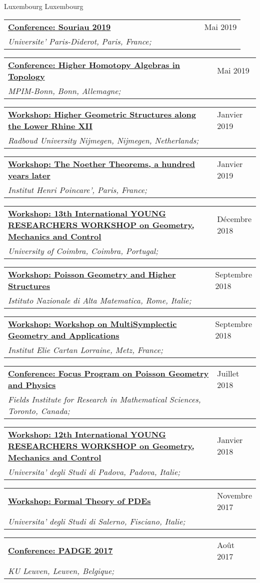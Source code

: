 \documentclass[a4paper]{article}
\newcommand{\longvoice}[8]{
    \begin{tabular}{p{0.83\linewidth} p{0.17\linewidth} }
        \textbf{\href{#3}{#2: #1}} & #4 
        \\ 
        \textit{#5, #6, #7;} & {\small\emph{#8}}
    \end{tabular}
    \vspace{.5em}
    }
\begin{document}
        {Luxembourg}
        {Luxembourg}
        {}
    \longvoice{Souriau 2019}
        {Conference}
        {https://web.archive.org/web/20190831102558/http://souriau2019.fr/?page_id=2}
        {Mai 2019}
        {Universite' Paris-Diderot}
        {Paris}
        {France}
        {}
    \longvoice{Higher Homotopy Algebras in Topology}
        {Conference}
        {https://web.archive.org/web/20190831103619/https://www.mpim-bonn.mpg.de/node/9245}
        {Mai 2019}
        {MPIM-Bonn}
        {Bonn}
        {Allemagne}
        {}
    \longvoice{Higher Geometric Structures along the Lower Rhine XII}
        {Workshop}
        {https://web.archive.org/web/20190831103524/https://www.math.ru.nl/~sagave/higher-structures-XII/}
        {Janvier 2019}
        {Radboud University Nijmegen}
        {Nijmegen}
        {Netherlands}
        {}
    \longvoice{The Noether Theorems, a hundred years later}
        {Workshop}
        {https://web.archive.org/web/20190831105634/http://noether.iecl.univ-lorraine.fr/noether_en.html}
        {Janvier 2019}
        {Institut Henri Poincare'}
        {Paris}
        {France}
        {}
    \longvoice{13th International YOUNG RESEARCHERS WORKSHOP on Geometry, Mechanics and Control}
        {Workshop}
        {https://web.archive.org/web/20190831103121/http://www.uc.pt/en/congressos/13yrw/programa}
        {Décembre 2018}
        {University of Coimbra}
        {Coimbra}
        {Portugal}
        {}
    \longvoice{Poisson Geometry and Higher Structures}
        {Workshop}
        {https://web.archive.org/web/20190831103317/http://www1.mat.uniroma1.it/ricerca/convegni/2018/hippo2018/index.html}
        {Septembre 2018}
        {Istituto Nazionale di Alta Matematica}
        {Rome}
        {Italie}
        {}
    \longvoice{Workshop on MultiSymplectic Geometry and Applications}
        {Workshop}
        {https://web.archive.org/web/20180704152639/http://www.math.univ-metz.fr/~wurzbacher/GEMSA.html}
        {Septembre 2018}
        {Institut Elie Cartan Lorraine}
        {Metz}
        {France}
        {}
    \longvoice{Focus Program on Poisson Geometry and Physics}
        {Conference}
        {https://web.archive.org/web/20190831105328/http://www.fields.utoronto.ca/activities/18-19/poisson-2018}
        {Juillet 2018}
        {Fields Institute for Research in Mathematical Sciences}
        {Toronto}
        {Canada}
        {}
    \longvoice{12th International YOUNG RESEARCHERS WORKSHOP on Geometry, Mechanics and Control}
        {Workshop}
        {http://events.math.unipd.it/12YRW/}
        {Janvier 2018}
        {Universita' degli Studi di Padova}
        {Padova}
        {Italie}
        {}
    \longvoice{Formal Theory of PDEs}
        {Workshop}
        {http://www.dipmat2.unisa.it/people/vitagliano/www/micro-workshop.html}
        {Novembre 2017}
        {Universita' degli Studi di Salerno}
        {Fisciano}
        {Italie}
        {}
    \longvoice{PADGE 2017}
        {Conference}
        {https://web.archive.org/web/20170924130155/https://wis.kuleuven.be/events/padge2017}
        {Août 2017}
        {KU Leuven}
        {Leuven}
        {Belgique}
        {}
\end{document}
